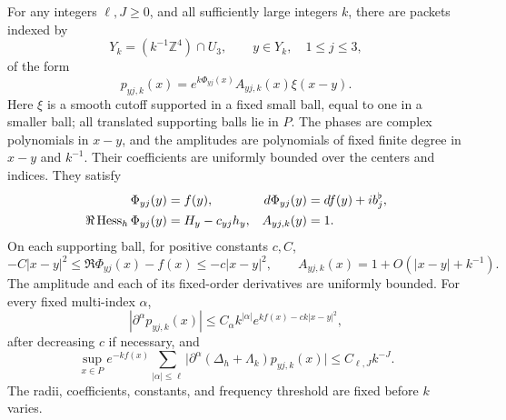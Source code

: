 \begin{proposition}\label{wave:packets}
For any integers $\ell,J\ge0$, and all sufficiently large integers $k$,
there are packets indexed by
\[
 Y_k=(k^{-1}\mathbb Z^4)\cap U_3,\qquad y\in Y_k,\quad 1\le j\le3,
\]
of the form
\begin{equation}
 p_{yj,k}(x)=e^{k\Phi_{yj}(x)}A_{yj,k}(x)\xi(x-y).
 \label{wave:packet-form}
\end{equation}
Here $\xi$ is a smooth cutoff supported in a fixed small ball, equal to
one in a smaller ball; all translated supporting balls lie in $P$.
The phases are complex polynomials in $x-y$, and the amplitudes are
polynomials of fixed finite degree in $x-y$ and $k^{-1}$. Their
coefficients are uniformly bounded over the centers and indices. They
satisfy
\begin{align}
 \Phi_{yj}(y)&=f(y),&
 d\Phi_{yj}(y)&=df(y)+i b_j^\flat,\notag\\
 \Re\operatorname{Hess}_h\Phi_{yj}(y)&=H_y-c_{yj}h_y,&
 A_{yj,k}(y)&=1.
 \label{wave:packet-jets}
\end{align}
On each supporting ball, for positive constants $c,C$,
\begin{equation}
 -C|x-y|^2\le\Re\Phi_{yj}(x)-f(x)
       \le-c|x-y|^2,
 \qquad
 A_{yj,k}(x)=1+O(|x-y|+k^{-1}).
 \label{wave:gaussian-bounds}
\end{equation}
The amplitude and each of its fixed-order derivatives are uniformly
bounded. For every fixed multi-index $\alpha$,
\begin{equation}
 |\partial^\alpha p_{yj,k}(x)|
 \le C_\alpha k^{|\alpha|}
              e^{kf(x)-ck|x-y|^2},
 \label{wave:packet-derivatives}
\end{equation}
after decreasing $c$ if necessary, and
\begin{equation}
 \sup_{x\in P}e^{-kf(x)}
 \sum_{|\alpha|\le\ell}
 \big|\partial^\alpha(\Delta_h+\Lambda_k)p_{yj,k}(x)\big|
 \le C_{\ell,J}k^{-J}.
 \label{wave:packet-residual}
\end{equation}
The radii, coefficients, constants, and frequency threshold are fixed
before $k$ varies.
\end{proposition}

